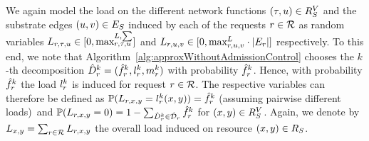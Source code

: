 \documentclass[10pt, conference, letterpaper]{IEEEtran}
\begin{document}
We again model the load on the different network functions $(\tau,u) \in  R^V_{S}$ and the substrate edges $(u,v) \in  E_S$ induced by each of the requests $r \in \mathcal{R}$ as random variables $L_{\req,\type,u} \in [0,\maxLoadVSum]$ and $L_{\req,u,v} \in [0,\maxLoadE \cdot |\VE|]$ respectively. To this end, we note that Algorithm~\ref{alg:approxWithoutAdmissionControl} chooses the $k$-th decomposition $\decompHat = (\probHat, \load,\mapping)$ with probability $\probHat$. Hence, with probability $\probHat$ the load $\load$ is induced for request $r \in \mathcal{R}$. The respective variables can therefore be defined as $
\mathbb{P}(L_{\req,x,y} = \load(x,y))= \probHat $ (assuming pairwise different loads)~and $\mathbb{P}(L_{\req,x,y} = 0)=  1 - \sum_{\decompHat \in \PotEmbeddingsHat } \probHat $ for $(x,y) \in  R^V_{S}$.
Again, we denote by $L_{x,y} = \sum_{r \in \mathcal{R}} L_{r,x,y}$ the overall load induced on resource $(x,y) \in  R_{S}$.
\end{document}
